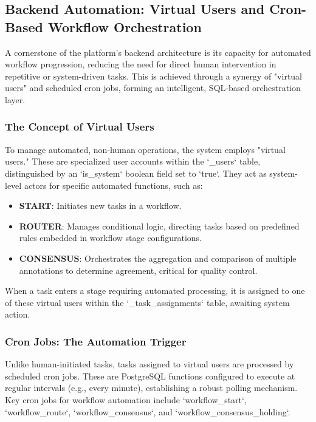 \subsection{Backend Automation: Virtual Users and Cron-Based Workflow Orchestration}
A cornerstone of the platform's backend architecture is its capacity for automated workflow progression, reducing the need for direct human intervention in repetitive or system-driven tasks. This is achieved through a synergy of "virtual users" and scheduled cron jobs, forming an intelligent, SQL-based orchestration layer.

\subsubsection{The Concept of Virtual Users}
To manage automated, non-human operations, the system employs "virtual users." These are specialized user accounts within the `\_users` table, distinguished by an `is\_system` boolean field set to `true`. They act as system-level actors for specific automated functions, such as:
\begin{itemize}
    \item \textbf{START}: Initiates new tasks in a workflow.
    \item \textbf{ROUTER}: Manages conditional logic, directing tasks based on predefined rules embedded in workflow stage configurations.
    \item \textbf{CONSENSUS}: Orchestrates the aggregation and comparison of multiple annotations to determine agreement, critical for quality control.
\end{itemize}
When a task enters a stage requiring automated processing, it is assigned to one of these virtual users within the `\_task\_assignments` table, awaiting system action.

\subsubsection{Cron Jobs: The Automation Trigger}
Unlike human-initiated tasks, tasks assigned to virtual users are processed by scheduled cron jobs. These are PostgreSQL functions configured to execute at regular intervals (e.g., every minute), establishing a robust polling mechanism. Key cron jobs for workflow automation include `workflow\_start`, `workflow\_route`, `workflow\_consensus`, and `workflow\_consensus\_holding`.

